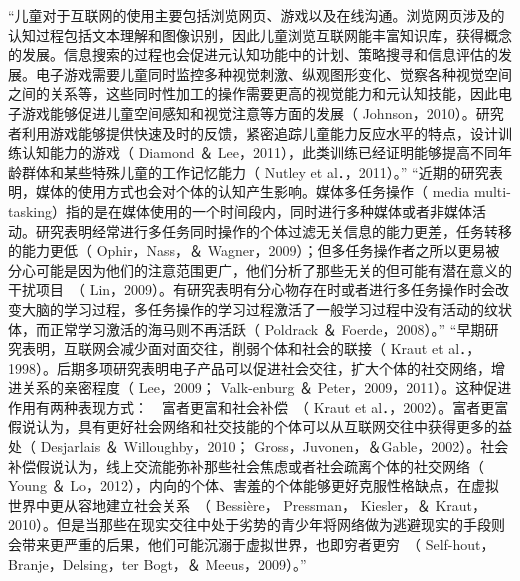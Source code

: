 “儿童对于互联网的使用主要包括浏览网页、游戏以及在线沟通。浏览网页涉及的认知过程包括文本理解和图像识别，因此儿童浏览互联网能丰富知识库，获得概念的发展。信息搜索的过程也会促进元认知功能中的计划、策略搜寻和信息评估的发展。电子游戏需要儿童同时监控多种视觉刺激、纵观图形变化、觉察各种视觉空间之间的关系等，这些同时性加工的操作需要更高的视觉能力和元认知技能，因此电子游戏能够促进儿童空间感知和视觉注意等方面的发展（ Johnson，2010）。研究者利用游戏能够提供快速及时的反馈，紧密追踪儿童能力反应水平的特点，设计训练认知能力的游戏（ Diamond ＆ Lee，2011），此类训练已经证明能够提高不同年龄群体和某些特殊儿童的工作记忆能力（ Nutley et al．，2011）。”
“近期的研究表明，媒体的使用方式也会对个体的认知产生影响。媒体多任务操作（ media multi-tasking）指的是在媒体使用的一个时间段内，同时进行多种媒体或者非媒体活动。研究表明经常进行多任务同时操作的个体过滤无关信息的能力更差，任务转移的能力更低（ Ophir，Nass，＆ Wagner，2009）；但多任务操作者之所以更易被分心可能是因为他们的注意范围更广，他们分析了那些无关的但可能有潜在意义的干扰项目　（ Lin，2009）。有研究表明有分心物存在时或者进行多任务操作时会改变大脑的学习过程，多任务操作的学习过程激活了一般学习过程中没有活动的纹状体，而正常学习激活的海马则不再活跃（ Poldrack ＆ Foerde，2008）。”
“早期研究表明，互联网会减少面对面交往，削弱个体和社会的联接（ Kraut et al．，1998）。后期多项研究表明电子产品可以促进社会交往，扩大个体的社交网络，增进关系的亲密程度（ Lee，2009； Valk-enburg ＆ Peter，2009，2011）。这种促进作用有两种表现方式：　富者更富和社会补偿　（ Kraut et al．，2002）。富者更富假说认为，具有更好社会网络和社交技能的个体可以从互联网交往中获得更多的益处（ Desjarlais ＆ Willoughby，2010； Gross，Juvonen，＆Gable，2002）。社会补偿假说认为，线上交流能弥补那些社会焦虑或者社会疏离个体的社交网络（ Young ＆ Lo，2012），内向的个体、害羞的个体能够更好克服性格缺点，在虚拟世界中更从容地建立社会关系　（ Bessière， Pressman， Kiesler，＆ Kraut，2010）。但是当那些在现实交往中处于劣势的青少年将网络做为逃避现实的手段则会带来更严重的后果，他们可能沉溺于虚拟世界，也即穷者更穷　（ Self-hout，Branje，Delsing，ter Bogt，＆ Meeus，2009）。”\cite{杨晓辉2014电子媒体的使用与儿童发展}

